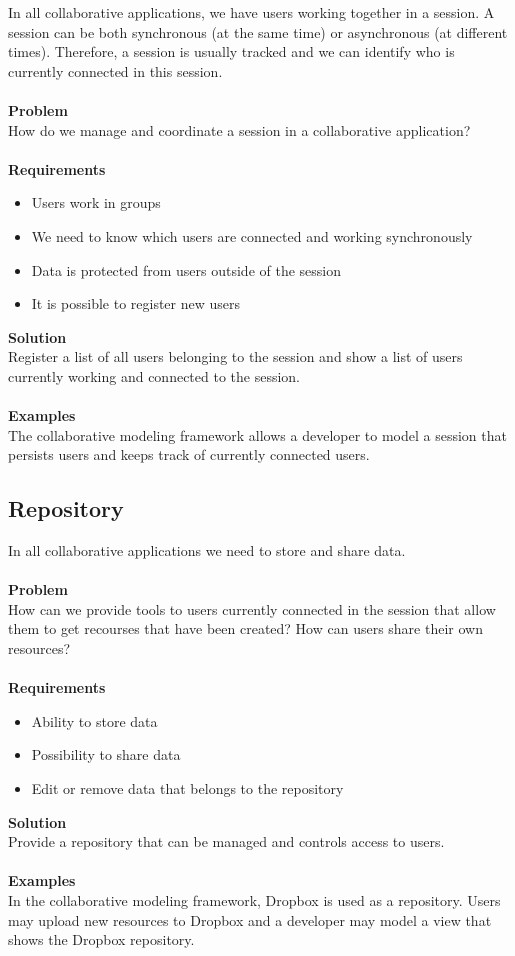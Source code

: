In all collaborative applications, we have users working together in a session. A session can be both synchronous (at the same time) or asynchronous (at different times). Therefore, a session is usually tracked and we can identify who is currently connected in this session.
\\ \\
\textbf{Problem}
\\
How do we manage and coordinate a session in a collaborative application?
\\ \\
\textbf{Requirements}
\begin{itemize}
\item{Users work in groups}
\item{We need to know which users are connected and working synchronously}
\item{Data is protected from users outside of the session}
\item{It is possible to register new users}
\end{itemize}
\textbf{Solution}
\\
Register a list of all users belonging to the session and show a list of users currently working and connected to the session.
\\ \\
\textbf{Examples}
\\
The collaborative modeling framework allows a developer to model a session that persists users and keeps track of currently connected users.

\subsection{Repository}

In all collaborative applications we need to store and share data.
\\ \\
\textbf{Problem}
\\
How can we provide tools to users currently connected in the session that allow them to get recourses that have been created? How can users share their own resources?
\\ \\
\textbf{Requirements}
\begin{itemize}
\item{Ability to store data}
\item{Possibility to share data}
\item{Edit or remove data that belongs to the repository}
\end{itemize}
\textbf{Solution}
\\
Provide a repository that can be managed and controls access to users.
\\ \\
\textbf{Examples}
\\
In the collaborative modeling framework, Dropbox is used as a repository. Users may upload new resources to Dropbox and a developer may model a view that shows the Dropbox repository.

